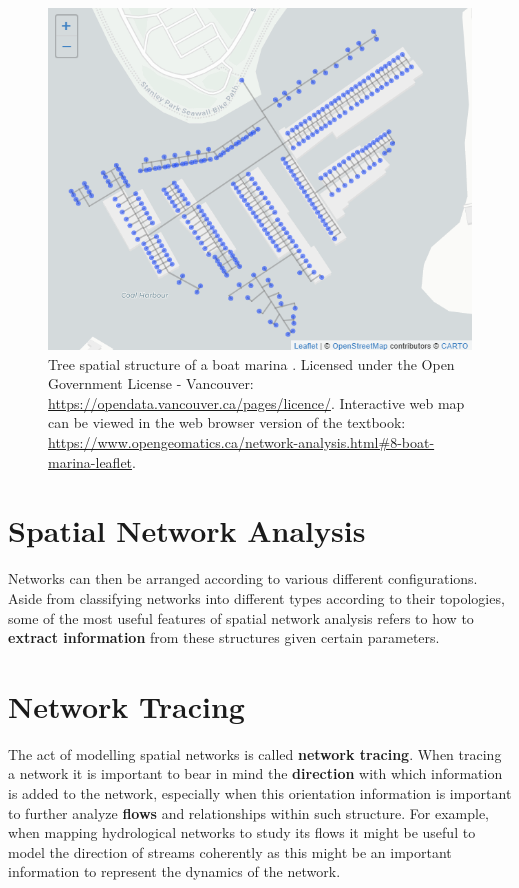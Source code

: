\documentclass[
]{book}
\begin{document}
\begin{figure}
\includegraphics[width=8.56in]{images/08-Tree-spatial-structure-of-a-boat-marina-static} \caption{Tree spatial structure of a boat marina \citep{city_of_vancouver_open_nodate}. Licensed under the Open Government License - Vancouver: \url{https://opendata.vancouver.ca/pages/licence/}. Interactive web map can be viewed in the web browser version of the textbook: \url{https://www.opengeomatics.ca/network-analysis.html\#8-boat-marina-leaflet}.}\label{fig:8-boat-marina-leaflet}
\end{figure}

\section{Spatial Network Analysis}\label{spatial-network-analysis}

Networks can then be arranged according to various different configurations. Aside from classifying networks into different types according to their topologies, some of the most useful features of spatial network analysis refers to how to \textbf{extract information} from these structures given certain parameters.

\section{Network Tracing}\label{network-tracing}

The act of modelling spatial networks is called \textbf{network tracing}. When tracing a network it is important to bear in mind the \textbf{direction} with which information is added to the network, especially when this orientation information is important to further analyze \textbf{flows} and relationships within such structure. For example, when mapping hydrological networks to study its flows it might be useful to model the direction of streams coherently as this might be an important information to represent the dynamics of the network.
\end{document}
